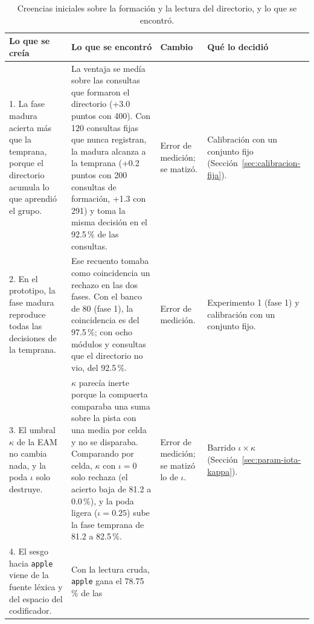 \begin{table}[H]
    \centering
    \caption[Creencias iniciales: formación y lectura del directorio]{Creencias
    iniciales sobre la formación y la lectura del directorio, y lo que se encontró.}
    \label{fase:tab-creencias-formacion}
    \footnotesize
    \setlength{\tabcolsep}{3pt}
    \begin{tabular}{p{}p{}p{}p{}}
        \toprule
        Lo que se creía & Lo que se encontró & Cambio & Qué lo decidió \\
        \midrule
        \raggedright 1. La fase madura acierta más que la temprana, porque el
        directorio acumula lo que aprendió el grupo. &
        \raggedright La ventaja se medía sobre las consultas que formaron el directorio
        (+3.0 puntos con 400). Con 120 consultas fijas que nunca registran, la madura
        alcanza a la temprana (+0.2 puntos con 200 consultas de formación, +1.3 con 291)
        y toma la misma decisión en el 92.5\,\% de las consultas. &
        \raggedright Error de medición; se matizó. &
        \raggedright Calibración con un conjunto fijo
        (Sección~\ref{sec:calibracion-fija}). \tabularnewline\addlinespace[4pt]
        \raggedright 2. En el prototipo, la fase madura reproduce todas las decisiones
        de la temprana. &
        \raggedright Ese recuento tomaba como coincidencia un rechazo en las dos fases.
        Con el banco de 80 (fase 1), la coincidencia es del 97.5\,\%; con ocho módulos y
        consultas que el directorio no vio, del 92.5\,\%. &
        \raggedright Error de medición. &
        \raggedright Experimento 1 (fase 1) y calibración con un conjunto fijo.
        \tabularnewline\addlinespace[4pt]
        \raggedright 3. El umbral $\kappa$ de la EAM no cambia nada, y la poda $\iota$
        solo destruye. &
        \raggedright $\kappa$ parecía inerte porque la compuerta comparaba una suma sobre
        la pista con una media por celda y no se disparaba. Comparando por celda,
        $\kappa$ con $\iota = 0$ solo rechaza (el acierto baja de 81.2 a 0.0\,\%), y la
        poda ligera ($\iota = 0.25$) sube la fase temprana de 81.2 a 82.5\,\%. &
        \raggedright Error de medición; se matizó lo de $\iota$. &
        \raggedright Barrido $\iota \times \kappa$
        (Sección~\ref{sec:param-iota-kappa}). \tabularnewline\addlinespace[4pt]
        \raggedright 4. El sesgo hacia \texttt{apple} viene de la fuente léxica y del
        espacio del codificador. &
        \raggedright Con la lectura cruda, \texttt{apple} gana el 78.75\,\% de las

\end{tabular}
\end{table}
